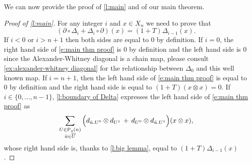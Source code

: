 We can now provide the proof of \cref{l:main} and of our main theorem.

\begin{proof}[Proof of \cref{l:main}]
	For any integer $i$ and $x \in X_n$ we need to prove that
	\begin{equation} \label{e:main thm proof}
	(\partial \circ \Delta_{i} + \Delta_{i} \circ \partial)(x) = (1 + T) \Delta_{i-1}(x).
	\end{equation}
	If $i < 0$ or $i > n+1$ then both sides are equal to $0$ by definition.
	If $i = 0$, the right hand side of \eqref{e:main thm proof} is $0$ by definition and the left hand side is $0$ since the Alexander-Whitney diagonal is a chain map, please consult \cref{ex:alexander-whitney diagonal} for the relationship between $\Delta_0$ and this well known map.
	If $i = n+1$, then the left hand side of \eqref{e:main thm proof} is equal to $0$ by definition and the right hand side is equal to $(1+T) (x \otimes x) = 0$.
	If $i \in \{0, \dots, n-1\}$, \cref{l:boundary of Delta} expresses the left hand side of \eqref{e:main thm proof} as
	\begin{equation*}
	\sum_{\substack{U \in \mathrm{P}_{q}(n) \\ {\bar{u}} \in \overline{U}}} \Big( d_{{\bar{u}}.U^0} \otimes d_{U^1} \, + \, d_{U^0} \otimes d_{{\bar{u}}.U^1} \Big) (x \otimes x),
	\end{equation*}
	whose right hand side is, thanks to \cref{l:big lemma}, equal to $(1+T)\Delta_{i-1}(x)$.
\end{proof}